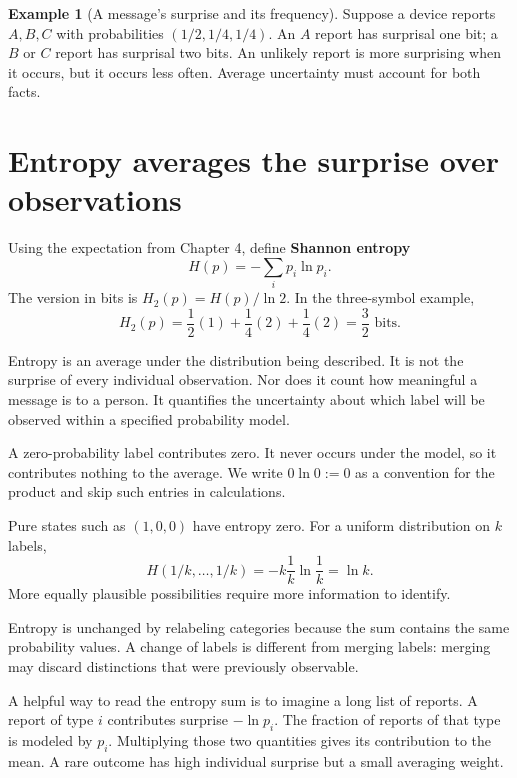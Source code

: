 \documentclass[11pt,oneside,openany]{book}
\theoremstyle{definition}
\newtheorem{example}{Example}[chapter]
\theoremstyle{remark}
\numberwithin{equation}{chapter}
\begin{document}
\begin{example}[A message's surprise and its frequency]

Suppose a device reports \(A,B,C\) with probabilities \((1/2,1/4,1/4)\). An \(A\) report has surprisal one bit; a \(B\) or \(C\) report has surprisal two bits. An unlikely report is more surprising when it occurs, but it occurs less often. Average uncertainty must account for both facts.

\end{example}

\section{Entropy averages the surprise over observations}\label{ch05-entropy-averages-the-surprise-over-observations}

Using the expectation from Chapter 4, define \textbf{Shannon entropy} \[\boxed{H(p)=-\sum_i p_i\ln p_i.}\] The version in bits is \(H_2(p)=H(p)/\ln2\). In the three-symbol example, \[H_2(p)=\frac12(1)+\frac14(2)+\frac14(2)=\frac32\text{ bits}.\]

Entropy is an average under the distribution being described. It is not the surprise of every individual observation. Nor does it count how meaningful a message is to a person. It quantifies the uncertainty about which label will be observed within a specified probability model.

A zero-probability label contributes zero. It never occurs under the model, so it contributes nothing to the average. We write \(0\ln0:=0\) as a convention for the product and skip such entries in calculations.

Pure states such as \((1,0,0)\) have entropy zero. For a uniform distribution on \(k\) labels, \[H(1/k,\ldots,1/k)=-k\frac1k\ln\frac1k=\ln k.\] More equally plausible possibilities require more information to identify.

Entropy is unchanged by relabeling categories because the sum contains the same probability values. A change of labels is different from merging labels: merging may discard distinctions that were previously observable.

A helpful way to read the entropy sum is to imagine a long list of reports. A report of type \(i\) contributes surprise \(-\ln p_i\). The fraction of reports of that type is modeled by \(p_i\). Multiplying those two quantities gives its contribution to the mean. A rare outcome has high individual surprise but a small averaging weight.
\end{document}
